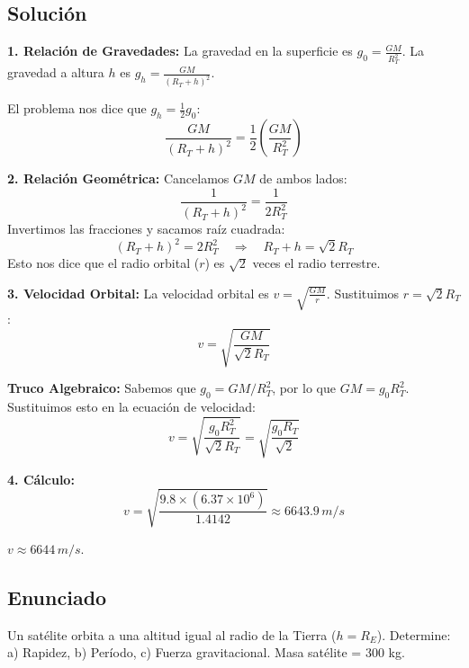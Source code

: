 \documentclass[12pt, a4paper]{article}
\begin{document}
\subsection*{Solución}

\textbf{1. Relación de Gravedades:}
La gravedad en la superficie es $g_0 = \frac{GM}{R_T^2}$.
La gravedad a altura $h$ es $g_h = \frac{GM}{(R_T+h)^2}$.

El problema nos dice que $g_h = \frac{1}{2} g_0$:
$$ \frac{GM}{(R_T+h)^2} = \frac{1}{2} \left( \frac{GM}{R_T^2} \right) $$

\textbf{2. Relación Geométrica:}
Cancelamos $GM$ de ambos lados:
$$ \frac{1}{(R_T+h)^2} = \frac{1}{2 R_T^2} $$
Invertimos las fracciones y sacamos raíz cuadrada:
$$ (R_T+h)^2 = 2 R_T^2 \quad \Rightarrow \quad R_T + h = \sqrt{2} R_T $$
Esto nos dice que el radio orbital ($r$) es $\sqrt{2}$ veces el radio terrestre.

\textbf{3. Velocidad Orbital:}
La velocidad orbital es $v = \sqrt{\frac{GM}{r}}$.
Sustituimos $r = \sqrt{2} R_T$:
$$ v = \sqrt{\frac{GM}{\sqrt{2} R_T}} $$

\textbf{Truco Algebraico:} Sabemos que $g_0 = GM/R_T^2$, por lo que $GM = g_0 R_T^2$. Sustituimos esto en la ecuación de velocidad:
$$ v = \sqrt{\frac{g_0 R_T^2}{\sqrt{2} R_T}} = \sqrt{\frac{g_0 R_T}{\sqrt{2}}} $$

\textbf{4. Cálculo:}
$$ v = \sqrt{\frac{9.8 \times (6.37 \times 10^6)}{1.4142}} \approx 6643.9 \, \si{m/s} $$

\begin{tcolorbox}[colback=green!5!white,title=Respuesta]
$v \approx 6644 \, \si{m/s}$.
\end{tcolorbox}

\newpage

\subsection*{Enunciado}
Un satélite orbita a una altitud igual al radio de la Tierra ($h = R_E$). Determine: a) Rapidez, b) Período, c) Fuerza gravitacional. Masa satélite = 300 kg.

\begin{center}
\end{center}
\end{document}
